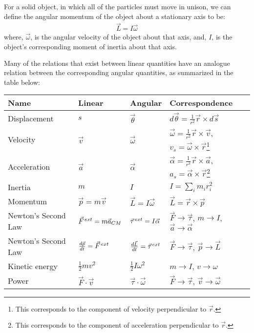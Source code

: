 \begin{chapterSummary}
For a solid object, in which all of the particles must move in unison, we can define the angular momentum of the object about a stationary axis to be:
\begin{align*}
\vec L = I\vec \omega
\end{align*}
where, $\vec\omega$, is the angular velocity of the object about that axis, and, $I$, is the object's corresponding moment of inertia about that axis. 

Many of the relations that exist between linear quantities have an analogue relation between the corresponding angular quantities, as summarized in the table below:

\begin{tabular}{llll}
\textbf{Name} &\textbf{Linear} & \textbf{Angular} & \textbf{Correspondence}\\
\hline\hline
Displacement & $s$ & $\vec \theta$ & $d\vec\theta=\frac{1}{r^2} \vec r\times d\vec s$  \\
Velocity & $\vec v$ & $\vec \omega$ & $\vec\omega=\frac{1}{r^2} \vec r\times \vec v$, $v_s = \vec\omega\times \vec r$\footnote{This corresponds to the component of velocity perpendicular to $\vec r$.}\\
Acceleration & $\vec a$ & $\vec \alpha$ & $\vec\alpha=\frac{1}{r^2} \vec r\times \vec a$, $a_s = \vec\alpha\times \vec r$\footnote{This corresponds to the component of acceleration perpendicular to $\vec r$.}\\
Inertia& $m$ & $I$ & $I=\sum_i m_ir_i^2$ \\
Momentum& $\vec p=m\vec v$& $\vec L = I\vec \omega$ &$\vec L = \vec r\times \vec p$ \\
Newton's Second Law&$\pvec F^{ext}=m\vec a_{CM}$ & $\pvec \tau^{ext} = I\vec\alpha$& $\vec F \to \vec\tau$, $m\to I$, $\vec a \to \vec \alpha$\\
Newton's Second Law& $\frac{d\vec p}{dt} =\pvec F^{ext}$ & $\frac{d\vec L}{dt} =\pvec \tau^{ext}$&$\vec F \to \vec\tau$, $\vec p \to \vec L$ \\
Kinetic energy&$\frac{1}{2}mv^2$ &$\frac{1}{2}I\omega^2$ &$m\to I$, $v\to \omega$ \\
Power&$\vec F \cdot \vec v$ &$\vec \tau \cdot \vec\omega$ &$\vec F \to \vec\tau$, $\vec v\to \vec\omega$  \\
\end{tabular}
\end{chapterSummary}

